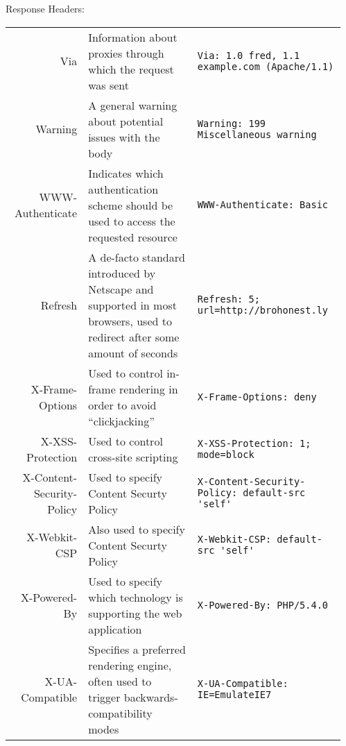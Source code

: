 \documentclass[final]{beamer}
\newcommand{\header}[1]{\texttt{\lstinline!#1!}}
\begin{document}
\begin{frame}{}
\begin{columns}
\begin{column}{0.4\textwidth}
\begin{block}{\huge{Response Headers:}}
\begin{tabular}{r p{} p{}}
            Via & Information about proxies through which the request was sent & \header{Via: 1.0 fred, 1.1 example.com (Apache/1.1) } \\
            Warning & A general warning about potential issues with the body & \header{Warning: 199 Miscellaneous warning } \\
            WWW-Authenticate & Indicates which authentication scheme should be used to access the requested resource & \header{WWW-Authenticate: Basic } \\ \hline
            Refresh & A de-facto standard introduced by Netscape and supported in most browsers, used to redirect after some amount of seconds & \header{Refresh: 5; url=http://brohonest.ly } \\
            X-Frame-Options & Used to control in-frame rendering in order to avoid ``clickjacking'' & \header{X-Frame-Options: deny } \\
            X-XSS-Protection & Used to control cross-site scripting & \header{X-XSS-Protection: 1; mode=block } \\
            X-Content-Security-Policy & Used to specify Content Securty Policy & \header{X-Content-Security-Policy: default-src 'self' } \\
            X-Webkit-CSP & Also used to specify Content Securty Policy & \header{X-Webkit-CSP: default-src 'self' } \\
            X-Powered-By & Used to specify which technology is supporting the web application & \header{X-Powered-By: PHP/5.4.0 } \\
            X-UA-Compatible & Specifies a preferred rendering engine, often used to trigger backwards-compatibility modes & \header{X-UA-Compatible: IE=EmulateIE7 } \\
          \end{tabular}

        \end{block}
      \end{column}
      \begin{column}{0.1\textwidth}
      \end{column}
    \end{columns}
  \end{frame}
\end{document}
